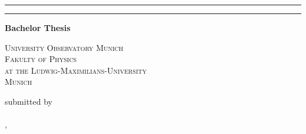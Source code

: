 \begin{titlepage}   

    {\parindent0cm
    \rule{\linewidth}{.4ex}}  
  \begin{center}
    {\sffamily \bfseries \Huge \getTitleEN \par}
  \end{center}
    \rule{\linewidth}{.4ex}
  

  \begin{center}
    {\rmfamily \bfseries \Large Bachelor Thesis}


    {\scshape \large
     University Observatory Munich \\
     Fakulty of Physics \\
     at the Ludwig-Maximilians-University \\
     Munich


     submitted by \\

     {\rmfamily \bfseries \Large \getAuthor} \\


     \getPrintLocationEN, \getSubmissionDateEN
     }
  \end{center}
  
\end{titlepage}
